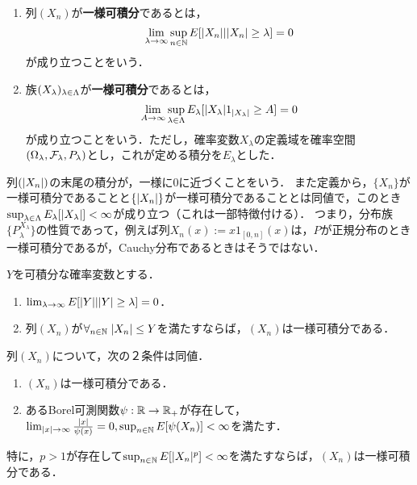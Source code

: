 \documentclass[uplatex,dvipdfmx]{jsreport}
\begin{document}
\begin{definition}\mbox{}
    \begin{enumerate}
        \item 列$(X_n)$が\textbf{一様可積分}であるとは，
        \[\lim_{\lambda\to\infty}\sup_{n\in\mathbb{N}}E[\lvert X_n\rvert|\lvert X_n\rvert\ge\lambda]=0\]
        が成り立つことをいう．
        \item 族$(X_\lambda)_{\lambda\in\Lambda}$が\textbf{一様可積分}であるとは，
        \[\lim_{A\to\infty}\sup_{\lambda\in\Lambda}E_\lambda[\lvert X_\lambda\rvert1_{\lvert X_\lambda\rvert}\ge A]=0\]
        が成り立つことをいう．ただし，確率変数$X_\lambda$の定義域を確率空間$(\Omega_\lambda,\mathcal{F}_\lambda,P_\lambda)$とし，これが定める積分を$E_\lambda$とした．
    \end{enumerate}
\end{definition}
\begin{remarks}
    列$(\lvert X_n\rvert)$の末尾の積分が，一様に$0$に近づくことをいう．
    また定義から，$\{X_n\}$が一様可積分であることと$\{\lvert X_n\rvert\}$が一様可積分であることとは同値で，このとき$\sup_{\lambda\in\Lambda}E_\lambda[\lvert X_\lambda\rvert]<\infty$が成り立つ（これは一部特徴付ける）．
    つまり，分布族$\{P^{X_\lambda}_\lambda\}$の性質であって，例えば列$X_n(x):=x1_{[0,n]}(x)$は，$P$が正規分布のとき一様可積分であるが，Cauchy分布であるときはそうではない．
\end{remarks}

\begin{lemma}[一様可積分性の十分条件]
    $Y$を可積分な確率変数とする．
    \begin{enumerate}
        \item $\lim_{\lambda\to\infty}E[\lvert Y\rvert|\lvert Y\rvert\ge\lambda]=0$．
        \item 列$(X_n)$が$\forall_{n\in\mathbb{N}}\;\lvert X_n\rvert\le Y$を満たすならば，$(X_n)$は一様可積分である．
    \end{enumerate}
\end{lemma}

\begin{lemma}[一様可積分性の特徴付け]
    列$(X_n)$について，次の２条件は同値．
    \begin{enumerate}
        \item $(X_n)$は一様可積分である．
        \item あるBorel可測関数$\psi:\mathbb{R}\to\mathbb{R}_+$が存在して，$\lim_{\lvert x\rvert\to\infty}\frac{\lvert x\rvert}{\psi(x)}=0,\sup_{n\in\mathbb{N}}E[\psi(X_n)]<\infty$を満たす．
    \end{enumerate}
    特に，$p>1$が存在して$\sup_{n\in\mathbb{N}}E[\lvert X_n\rvert^p]<\infty$を満たすならば，$(X_n)$は一様可積分である．
\end{lemma}
\end{document}
